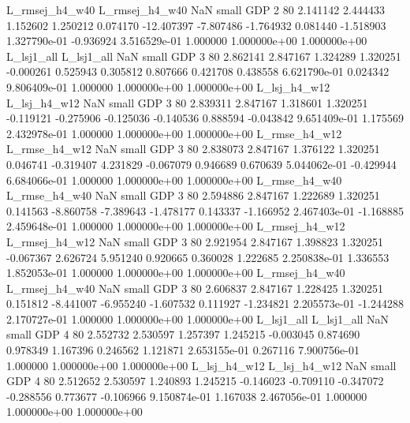 L_rmsej_h4_w40 L_rmsej_h4_w40                   NaN      small      GDP                 2 80 2.141142       2.444433 1.152602       1.250212    0.074170    -12.407397     -7.807486    -1.764932       0.081440 -1.518903 1.327790e-01    -0.936924   3.516529e-01            1.000000    1.000000e+00        1.000000e+00
    L_lsj1_all     L_lsj1_all                   NaN      small      GDP                 3 80 2.862141       2.847167 1.324289       1.320251   -0.000261      0.525943      0.305812     0.807666       0.421708  0.438558 6.621790e-01     0.024342   9.806409e-01            1.000000    1.000000e+00        1.000000e+00
  L_lsj_h4_w12   L_lsj_h4_w12                   NaN      small      GDP                 3 80 2.839311       2.847167 1.318601       1.320251   -0.119121     -0.275906     -0.125036    -0.140536       0.888594 -0.043842 9.651409e-01     1.175569   2.432978e-01            1.000000    1.000000e+00        1.000000e+00
 L_rmse_h4_w12  L_rmse_h4_w12                   NaN      small      GDP                 3 80 2.838073       2.847167 1.376122       1.320251    0.046741     -0.319407      4.231829    -0.067079       0.946689  0.670639 5.044062e-01    -0.429944   6.684066e-01            1.000000    1.000000e+00        1.000000e+00
 L_rmse_h4_w40  L_rmse_h4_w40                   NaN      small      GDP                 3 80 2.594886       2.847167 1.222689       1.320251    0.141563     -8.860758     -7.389643    -1.478177       0.143337 -1.166952 2.467403e-01    -1.168885   2.459648e-01            1.000000    1.000000e+00        1.000000e+00
L_rmsej_h4_w12 L_rmsej_h4_w12                   NaN      small      GDP                 3 80 2.921954       2.847167 1.398823       1.320251   -0.067367      2.626724      5.951240     0.920665       0.360028  1.222685 2.250838e-01     1.336553   1.852053e-01            1.000000    1.000000e+00        1.000000e+00
L_rmsej_h4_w40 L_rmsej_h4_w40                   NaN      small      GDP                 3 80 2.606837       2.847167 1.228425       1.320251    0.151812     -8.441007     -6.955240    -1.607532       0.111927 -1.234821 2.205573e-01    -1.244288   2.170727e-01            1.000000    1.000000e+00        1.000000e+00
    L_lsj1_all     L_lsj1_all                   NaN      small      GDP                 4 80 2.552732       2.530597 1.257397       1.245215   -0.003045      0.874690      0.978349     1.167396       0.246562  1.121871 2.653155e-01     0.267116   7.900756e-01            1.000000    1.000000e+00        1.000000e+00
  L_lsj_h4_w12   L_lsj_h4_w12                   NaN      small      GDP                 4 80 2.512652       2.530597 1.240893       1.245215   -0.146023     -0.709110     -0.347072    -0.288556       0.773677 -0.106966 9.150874e-01     1.167038   2.467056e-01            1.000000    1.000000e+00        1.000000e+00
